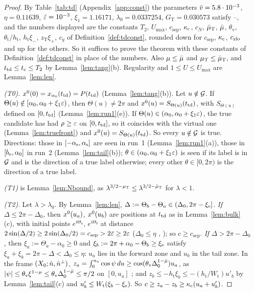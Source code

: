 \begin{proof}
By Table~\ref{tab:td} (Appendix~\ref{app:const}) the parameters $\bar v=5.8\cdot10^{-3}$, $\eta=0.11639$, $\bar\varepsilon=10^{-3}$,
$\xi_1=1.16171$, $\lambda_0=0.0337254$, $G_{\mathrm T}=0.030573$ satisfy --, and the numbers displayed are the
constants
$T_2$, $U_{\max}$, $c_{\mathrm{sep}}$, $\kappa_{\mathrm c}$, $c_N$, $\bar\mu_{\mathrm T}$, $\bar\mu$, $\theta_{\mathrm v}$, $\theta_{\mathrm t}/h_{\mathrm t}$,
$h_{\mathrm t}\xi_-$, $z_{\mathrm T}\xi_+$, $c_y$ of Definition~\ref{def:tdconst}, rounded down for $c_{\mathrm{sep}}$, $\kappa_{\mathrm c}$, $c_{\mathrm{zlo}}$ and up
for the others. So it suffices to prove the theorem with these constants of Definition~\ref{def:tdconst} in place of the numbers. Also
$\mu\le\bar\mu$ and $\mu_{\mathrm T}\le\bar\mu_{\mathrm T}$, and $t_{\mathrm{td}}\le t_{\mathrm c}\le T_2$ by Lemma~\ref{lem:tang}(b). Regularity and $1\le U\le U_{\max}$ are
Lemma~\ref{lem:len}.

\emph{\textup{(T0)}.} $x^0(0)=x_{\alpha_0}(t_{\mathrm{td}})=P(t_{\mathrm{td}})$ (Lemma~\ref{lem:tang}(b)). Let $u\notin\mathcal G$. If
$\Theta(u)\notin[\alpha_0,\alpha_0+\xi_1\varepsilon)$, then $\Theta(u)\ne2\pi$ and $x^0(u)=S_{\Theta(u)}(t_{\mathrm{td}})$, with $S_{\Theta(u)}$ defined on
$[0,t_{\mathrm{td}}]$ (Lemma~\ref{lem:run1}(e)). If $\Theta(u)\in(\alpha_0,\alpha_0+\xi_1\varepsilon)$, the true candidate has had $\rho\ge\varepsilon$ on
$[0,t_{\mathrm{td}}]$, so it coincides with the virtual one (Lemma~\ref{lem:truefront}) and $x^0(u)=S_{\Theta(u)}(t_{\mathrm{td}})$. So every $u\notin\mathcal G$ is
true. Directions: those in $[-\alpha_{\mathrm s},\alpha_{\mathrm s}]$ are seen in run~1 (Lemma~\ref{lem:run1}(a)), those in $[b_{\mathrm e},\alpha_0]$ in run~2
(Lemma~\ref{lem:tail}(b)); $\theta\in(\alpha_0,\alpha_0+\xi_1\varepsilon)$ is seen if its label is in $\mathcal G$ and is the direction of a true
label otherwise; every other $\theta\in[0,2\pi)$ is the direction of a true label.

\emph{\textup{(T1)}} is Lemma~\ref{lem:Nbound}, as $\lambda^{3/2-\mu_{\mathrm T}}\le\lambda^{3/2-\bar\mu_{\mathrm T}}$ for $\lambda<1$.

\emph{\textup{(T2)}.} Let $\lambda>\lambda_0$. By Lemma~\ref{lem:len}, $\Delta:=\Theta_b-\Theta_a\in(\Delta_0,2\pi-\xi_{\mathrm e}]$.
\emph{If $\Delta\le2\pi-\Delta_0$,} then $x^0(u_a)$, $x^0(u_b)$ are positions at $t_{\mathrm{td}}$ as in Lemma~\ref{lem:bulk}(c), with initial points
$e^{i\Theta_a}$, $e^{i\Theta_b}$ at distance $2\sin(\Delta/2)\ge2\sin(\Delta_0/2)=c_{\mathrm{sep}}>2\bar\varepsilon\ge2\varepsilon$ ($\Delta_0\le\eta$
, ); so $c\ge c_{\mathrm{sep}}$. \emph{If $\Delta>2\pi-\Delta_0$,} then $\xi_a:=\Theta_a-\alpha_0\ge0$ and
$\xi_b:=2\pi+\alpha_0-\Theta_b\ge\xi_{\mathrm e}$ satisfy $\xi_a+\xi_b=2\pi-\Delta<\Delta_0\le\eta$: $u_a$ lies in the forward zone and $u_b$ in the
tail zone. In the frame $(X_0;\hat n,\hat n^\perp)$, $z_a=\int_0^{u_a}\cos\psi\,du\ge\cos(\theta_{\mathrm v}\Delta_0^{1-\bar\mu})u_a$, as
$|\psi|\le\theta_{\mathrm v}\xi^{1-\mu}\le\theta_{\mathrm v}\Delta_0^{1-\bar\mu}\le\pi/2$ on $[0,u_a]$ ; and
$z_b\le-h_{\mathrm t}\xi_b\le-(h_{\mathrm t}/W_{\mathrm t})u'_b$ by Lemma~\ref{lem:tail}(c) and $u'_b\le W_{\mathrm t}(\xi_b-\xi_{\mathrm e})$. So
$c\ge z_a-z_b\ge\kappa_{\mathrm c}(u_a+u'_b)$.


\end{proof}
